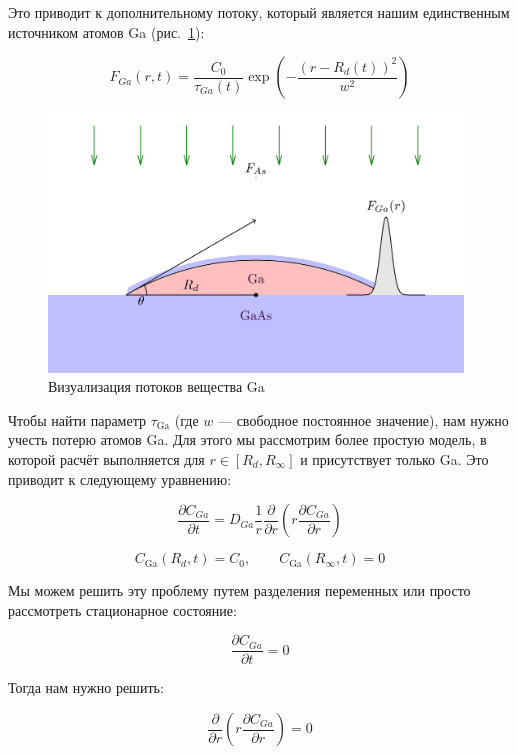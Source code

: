 \documentclass[14pt,oneside]{extarticle}
\begin{document}
Это приводит к дополнительному потоку, который является нашим единственным источником атомов Ga (рис.~\ref{fig:first}):

\begin{equation}
F_{Ga}\left(r,t\right)=\frac{C_{0}}{\tau_{Ga}\left(t\right)}\exp\left(-\frac{\left(r-R_{d}\left(t\right)\right)^{2}}{w^{2}}\right)
\end{equation}

\begin{figure}
    \begin{center}
        \includegraphics[width=11cm]{images/first.png}
        \caption{\label{fig:first}
        Визуализация потоков вещества Ga}
    \end{center}
\end{figure}

Чтобы найти параметр $\tau_{\text{Ga}}$ (где $w$ — свободное постоянное значение), нам нужно учесть потерю атомов Ga. Для этого мы рассмотрим более простую модель, в которой расчёт выполняется для $r \in [R_{d}, R_{\infty}]$ и присутствует только Ga. Это приводит к следующему уравнению:

\begin{equation}
\frac{\partial C_{Ga}}{\partial t}=D_{Ga}\frac{1}{r}\frac{\partial}{\partial r}\left(r\frac{\partial C_{Ga}}{\partial r}\right)
\end{equation}

\[
C_{\text{Ga}}\left(R_d, t\right) = C_0,
\qquad
C_{\text{Ga}}\left(R_\infty, t\right) = 0
\]

Мы можем решить эту проблему путем разделения переменных или просто рассмотреть стационарное состояние:

\[
\frac{\partial C_{Ga}}{\partial t}=0
\]

Тогда нам нужно решить:

\[
\frac{\partial}{\partial r}\left(r\frac{\partial C_{Ga}}{\partial r}\right)=0
\]
\end{document}
